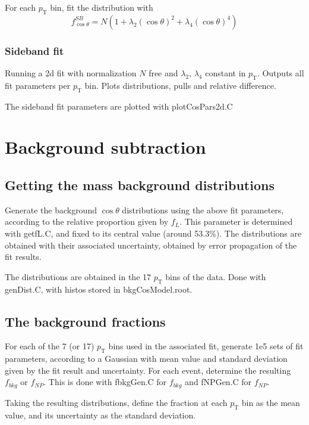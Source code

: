 \documentclass{article}
\newcommand{\pt}{p_\text{T}}
\newcommand{\cost}{\cos\theta}
\begin{document}
For each $\pt$ bin, fit the distribution with
\begin{equation}
f_{\cost}^{SB} = N\left(1+\lambda_2(\cost)^2+\lambda_4(\cost)^4\right)
\end{equation}

\subsubsection{Sideband fit}

Running a 2d fit with normalization $N$ free and $\lambda_2$, $\lambda_4$ constant in $\pt$. Outputs all fit parameters per $\pt$ bin. Plots distributions, pulls and relative difference.

The sideband fit parameters are plotted with plotCosPars2d.C

\pagebreak

\section{Background subtraction}

\subsection{Getting the mass background distributions}

Generate the background $\cost$ distributions using the above fit parameters, according to the relative proportion given by $f_L$. This parameter is determined with getfL.C, and fixed to its central value (around 53.3\%). The distributions are obtained with their associated uncertainty, obtained by error propagation of the fit results.

The distributions are obtained in the 17 $\pt$ bins of the data. Done with genDist.C, with histos stored in bkgCosModel.root.

\subsection{The background fractions}

For each of the 7 (or 17) $\pt$ bins used in the associated fit, generate 1e5 sets of fit parameters, according to a Gaussian with mean value and standard deviation given by the fit result and uncertainty. For each event, determine the resulting $f_{bkg}$ or $f_{NP}$. This is done with fbkgGen.C for $f_{bkg}$ and fNPGen.C for $f_{NP}$.

Taking the resulting distributions, define the fraction at each $\pt$ bin as the mean value, and its uncertainty as the standard deviation. 
\end{document}
